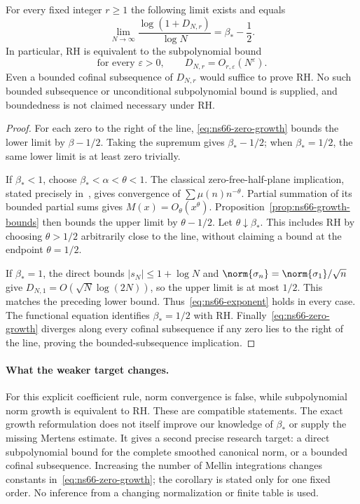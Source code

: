 \begin{corollary}
\label{cor:ns66-growth-exponent}
For every fixed integer $r\geq1$ the following limit exists and equals
\begin{equation}
 \lim_{N\to\infty}\frac{\log(1+D_{N,r})}{\log N}
                  =\beta_*-\frac12.
 \label{eq:ns66-exponent}
\end{equation}
In particular, RH is equivalent to the subpolynomial bound
\[
 \text{for every }\varepsilon>0,\qquad
 D_{N,r}=O_{r,\varepsilon}(N^\varepsilon).
\]
Even a bounded cofinal subsequence of $D_{N,r}$ would suffice to
prove RH. No such bounded subsequence or unconditional subpolynomial
bound is supplied, and boundedness is not claimed necessary under RH.
\end{corollary}
\begin{proof}
For each zero to the right of the line,
\eqref{eq:ns66-zero-growth} bounds the lower limit by
$\beta-1/2$. Taking the supremum gives $\beta_*-1/2$; when
$\beta_*=1/2$, the same lower limit is at least zero trivially.

If $\beta_*<1$, choose $\beta_*<\alpha<\theta<1$.
The classical zero-free-half-plane implication, stated precisely
in~\cite[Lemma 2.1]{BaezDuarteStrong}, gives convergence of
$\sum\mu(n)n^{-\theta}$. Partial summation of its bounded partial
sums gives $M(x)=O_\theta(x^\theta)$.
Proposition~\ref{prop:ns66-growth-bounds} then bounds the upper
limit by $\theta-1/2$. Let $\theta\downarrow\beta_*$.
This includes RH by choosing $\theta>1/2$ arbitrarily close to the
line, without claiming a bound at the endpoint $\theta=1/2$.

If $\beta_*=1$, the direct bounds $|s_N|\leq1+\log N$ and
$\norm{\sigma_n}=\norm{\sigma_1}/\sqrt n$ give
$D_{N,1}=O(\sqrt N\log(2N))$, so the upper limit is at most
$1/2$. This matches the preceding lower bound.
Thus~\eqref{eq:ns66-exponent} holds in every case.
The functional equation identifies $\beta_*=1/2$ with RH.
Finally~\eqref{eq:ns66-zero-growth} diverges along every cofinal
subsequence if any zero lies to the right of the line, proving the
bounded-subsequence implication.
\end{proof}

\paragraph{What the weaker target changes.}
For this explicit coefficient rule, norm convergence is false, while
subpolynomial norm growth is equivalent to RH. These are compatible
statements. The exact growth reformulation does not itself improve
our knowledge of $\beta_*$ or supply the missing Mertens estimate.
It gives a second precise research target: a direct subpolynomial
bound for the complete smoothed canonical norm, or a bounded cofinal
subsequence. Increasing the number of Mellin integrations changes
constants in~\eqref{eq:ns66-zero-growth}; the corollary is stated
only for one fixed order. No inference from a changing normalization
or finite table is used.
